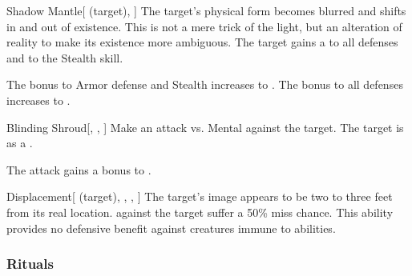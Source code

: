 \lowercase{\hypertarget{spell:Shadow Mantle}{}}\label{spell:Shadow Mantle}
\begin{attuneability}[Rank 4]{\hypertarget{spell:Shadow Mantle}{Shadow Mantle}}[ (target), ]
The target's physical form becomes blurred and shifts in and out of existence.
This is not a mere trick of the light, but an alteration of reality to make its existence more ambiguous.
The target gains a   to all defenses and to the Stealth skill.

\rankline
{} The bonus to Armor defense and Stealth increases to .
 The bonus to all defenses increases to .
\end{attuneability}
\vspace{0.25em}



\lowercase{\hypertarget{spell:Blinding Shroud}{}}\label{spell:Blinding Shroud}
\begin{freeability}[Rank 6]{\hypertarget{spell:Blinding Shroud}{Blinding Shroud}}[, , ]
Make an attack vs. Mental against the target.
\hit The target is  as a .

\rankline
{} The attack gains a  bonus to .
\end{freeability}
\vspace{0.25em}



\lowercase{\hypertarget{spell:Displacement}{}}\label{spell:Displacement}
\begin{attuneability}[Rank 7]{\hypertarget{spell:Displacement}{Displacement}}[ (target), , , ]
The target's image appears to be two to three feet from its real location.
  against the target suffer a 50\% miss chance.
This ability provides no defensive benefit against creatures immune to  abilities.
\end{attuneability}
\vspace{0.25em}



\subsubsection{Rituals}


